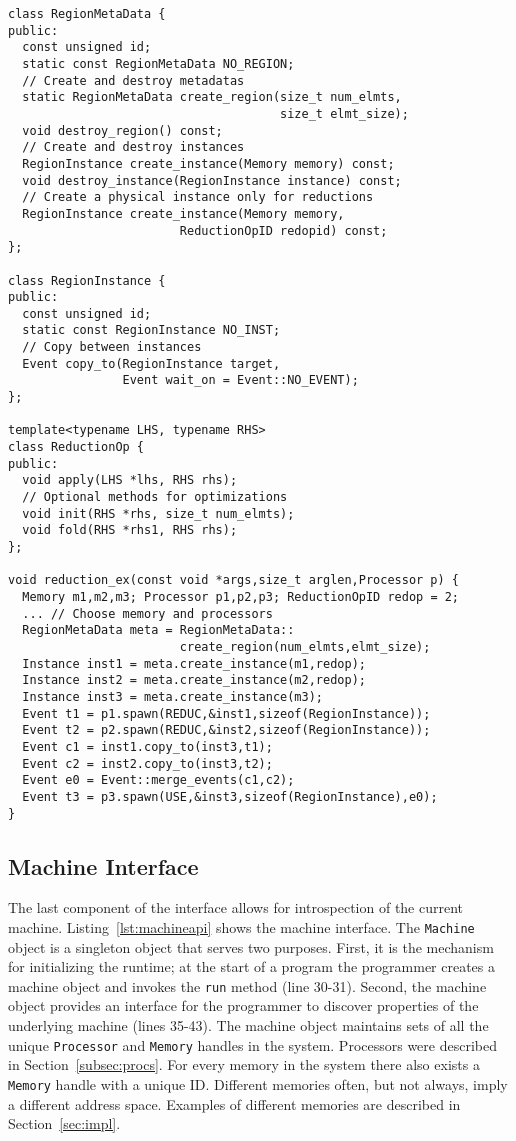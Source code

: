 \begin{lstlisting}[float={t},label={lst:regionapi},caption={Physical Region Interface and Example.}]
class RegionMetaData {
public:
  const unsigned id;
  static const RegionMetaData NO_REGION;
  // Create and destroy metadatas
  static RegionMetaData create_region(size_t num_elmts, 
                                      size_t elmt_size);
  void destroy_region() const;
  // Create and destroy instances
  RegionInstance create_instance(Memory memory) const;
  void destroy_instance(RegionInstance instance) const;
  // Create a physical instance only for reductions
  RegionInstance create_instance(Memory memory, 
                        ReductionOpID redopid) const;
};

class RegionInstance {
public:
  const unsigned id;
  static const RegionInstance NO_INST;
  // Copy between instances
  Event copy_to(RegionInstance target, 
                Event wait_on = Event::NO_EVENT);
};

template<typename LHS, typename RHS>
class ReductionOp {
public:
  void apply(LHS *lhs, RHS rhs);
  // Optional methods for optimizations
  void init(RHS *rhs, size_t num_elmts);
  void fold(RHS *rhs1, RHS rhs);
};

void reduction_ex(const void *args,size_t arglen,Processor p) {
  Memory m1,m2,m3; Processor p1,p2,p3; ReductionOpID redop = 2;
  ... // Choose memory and processors
  RegionMetaData meta = RegionMetaData::
                        create_region(num_elmts,elmt_size);
  Instance inst1 = meta.create_instance(m1,redop);
  Instance inst2 = meta.create_instance(m2,redop);
  Instance inst3 = meta.create_instance(m3);
  Event t1 = p1.spawn(REDUC,&inst1,sizeof(RegionInstance));
  Event t2 = p2.spawn(REDUC,&inst2,sizeof(RegionInstance));
  Event c1 = inst1.copy_to(inst3,t1);
  Event c2 = inst2.copy_to(inst3,t2);
  Event e0 = Event::merge_events(c1,c2);
  Event t3 = p3.spawn(USE,&inst3,sizeof(RegionInstance),e0);
}
\end{lstlisting}


\subsection{Machine Interface}
\label{subsec:machmodel}
The last component of the interface allows for introspection of the current machine.
Listing~\ref{lst:machineapi} shows the machine interface.
The {\tt Machine} object is a singleton object that serves two purposes.  First, it
is the mechanism for initializing the runtime; at the start of a program the programmer
creates a machine object and invokes the {\tt run} method (line 30-31).
Second, the machine object provides an interface for the programmer to 
discover properties of the underlying machine (lines 35-43).  The machine object maintains
sets of all the unique {\tt Processor} and {\tt Memory} handles in the system.  Processors
were described in Section~\ref{subsec:procs}.  For every memory in the system there also 
exists a {\tt Memory} handle with a unique ID.  Different memories often, but not always, 
imply a different address space.  Examples of different memories are described in
Section~\ref{sec:impl}.

